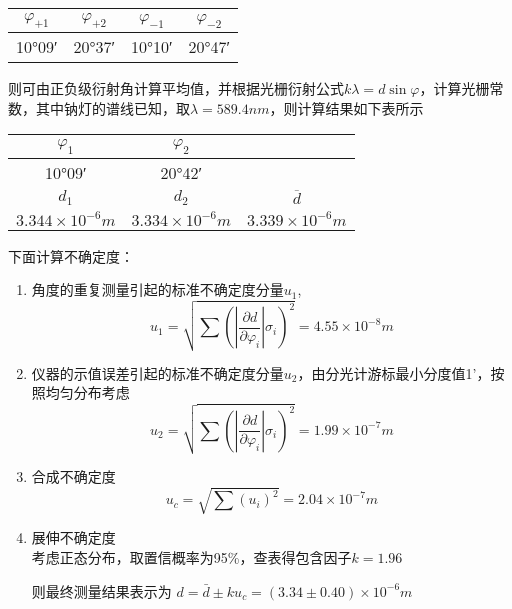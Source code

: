 \documentclass[dvipsnames, svgnames,a4paper,11pt]{article}
\begin{document}
		\begin{center}
			\begin{tabular}{|c|c|c|c|}
				\hline
				$\varphi_{+1}$ & $\varphi_{+2}$ & $\varphi_{-1}$ & $\varphi_{-2}$ \\
				\hline
				10°09′ & 20°37′ & 10°10′ & 20°47′ \\
				\hline
			\end{tabular}
		\end{center}

		
		则可由正负级衍射角计算平均值，并根据光栅衍射公式$k\lambda=d\sin{\varphi}$，计算光栅常数，其中钠灯的谱线已知，取$\lambda=589.4nm$，则计算结果如下表所示
		
		\begin{center}
			\begin{tabular}{|c|c|c|}
				\hline
				$\varphi_1$ & $\varphi_2$ &  \\
				\hline
				10°09′ & 20°42′ &  \\
				\hline
				$d_1$ & $d_2$ & $\overline{d}$ \\
				\hline
				$3.344\times{10}^{-6}m$ & $3.334\times{10}^{-6}m$ & $3.339\times{10}^{-6}m$ \\
				\hline
			\end{tabular}
		\end{center}

		下面计算不确定度：
		
		\begin{enumerate}
			\item  角度的重复测量引起的标准不确定度分量$u_1$,
					\[ u_1=\sqrt{\sum{(\left|\frac{\partial d}{\partial\varphi_i}\right|\sigma_i)}^2}=4.55\times{10}^{-8}m \]
					
			\item  仪器的示值误差引起的标准不确定度分量$u_2$，由分光计游标最小分度值1’，按照均匀分布考虑
					\[ u_2=\sqrt{\sum{(\left|\frac{\partial d}{\partial\varphi_i}\right|\sigma_i)}^2}=1.99\times{10}^{-7}m \]
			
			\item  合成不确定度
					\[ u_c=\sqrt{\sum{(u_i)}^2}=2.04\times{10}^{-7}m \]
			
			\item 展伸不确定度\\
					考虑正态分布，取置信概率为95\%，查表得包含因子$k=1.96$
					
					则最终测量结果表示为 $ d=\bar{d}\pm ku_c=(3.34\pm0.40)\times{10}^{-6}m$
					
					
		\end{enumerate}
		
\end{document}
